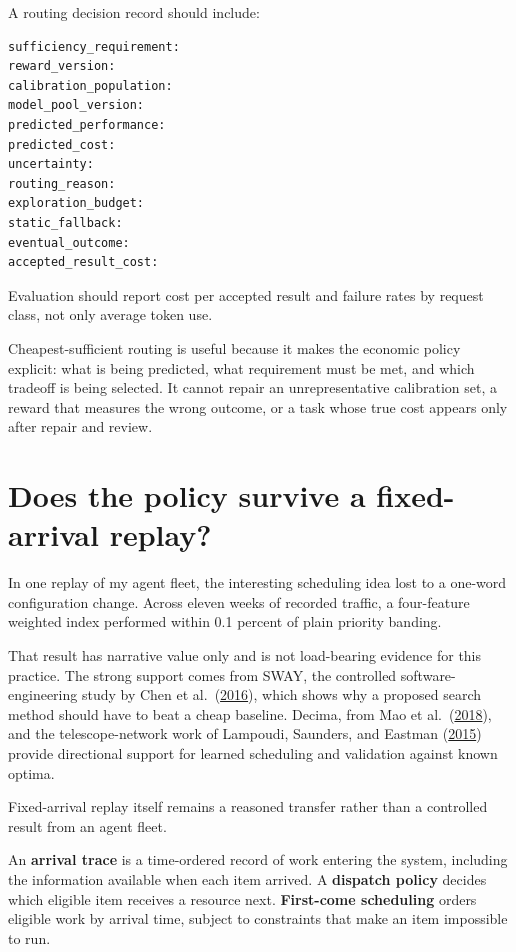 A routing decision record should include:

\begin{verbatim}
sufficiency_requirement:
reward_version:
calibration_population:
model_pool_version:
predicted_performance:
predicted_cost:
uncertainty:
routing_reason:
exploration_budget:
static_fallback:
eventual_outcome:
accepted_result_cost:
\end{verbatim}

Evaluation should report cost per accepted result and failure rates by request class, not only average token use.

Cheapest-sufficient routing is useful because it makes the economic policy explicit: what is being predicted, what requirement must be met, and which tradeoff is being selected. It cannot repair an unrepresentative calibration set, a reward that measures the wrong outcome, or a task whose true cost appears only after repair and review.

\hypertarget{does-the-policy-survive-a-fixed-arrival-replay}{%
\section{Does the policy survive a fixed-arrival replay?}\label{does-the-policy-survive-a-fixed-arrival-replay}}

In one replay of my agent fleet, the interesting scheduling idea lost to a one-word configuration change. Across eleven weeks of recorded traffic, a four-feature weighted index performed within 0.1 percent of plain priority banding.

That result has narrative value only and is not load-bearing evidence for this practice. The strong support comes from SWAY, the controlled software-engineering study by Chen et al.~(\href{https://arxiv.org/abs/1608.07617}{2016}), which shows why a proposed search method should have to beat a cheap baseline. Decima, from Mao et al.~(\href{https://arxiv.org/abs/1810.01963}{2018}), and the telescope-network work of Lampoudi, Saunders, and Eastman (\href{https://arxiv.org/abs/1503.07170}{2015}) provide directional support for learned scheduling and validation against known optima.

Fixed-arrival replay itself remains a reasoned transfer rather than a controlled result from an agent fleet.

An \textbf{arrival trace} is a time-ordered record of work entering the system, including the information available when each item arrived. A \textbf{dispatch policy} decides which eligible item receives a resource next. \textbf{First-come scheduling} orders eligible work by arrival time, subject to constraints that make an item impossible to run.

